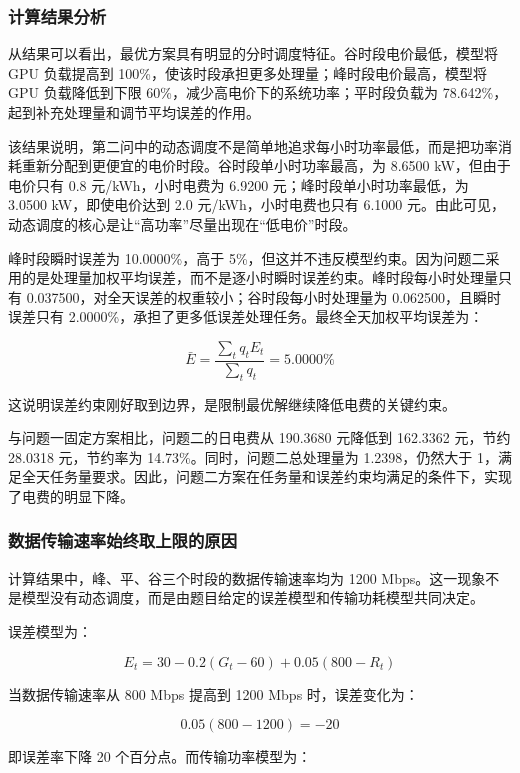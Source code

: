 \documentclass[
]{article}
\begin{document}
\subsubsection{计算结果分析}\label{ux8ba1ux7b97ux7ed3ux679cux5206ux6790}

从结果可以看出，最优方案具有明显的分时调度特征。谷时段电价最低，模型将
GPU 负载提高到 100\%，使该时段承担更多处理量；峰时段电价最高，模型将 GPU
负载降低到下限 60\%，减少高电价下的系统功率；平时段负载为
78.642\%，起到补充处理量和调节平均误差的作用。

该结果说明，第二问中的动态调度不是简单地追求每小时功率最低，而是把功率消耗重新分配到更便宜的电价时段。谷时段单小时功率最高，为
8.6500 kW，但由于电价只有 0.8 元/kWh，小时电费为 6.9200
元；峰时段单小时功率最低，为 3.0500 kW，即使电价达到 2.0
元/kWh，小时电费也只有 6.1000
元。由此可见，动态调度的核心是让``高功率''尽量出现在``低电价''时段。

峰时段瞬时误差为 10.0000\%，高于
5\%，但这并不违反模型约束。因为问题二采用的是处理量加权平均误差，而不是逐小时瞬时误差约束。峰时段每小时处理量只有
0.037500，对全天误差的权重较小；谷时段每小时处理量为
0.062500，且瞬时误差只有
2.0000\%，承担了更多低误差处理任务。最终全天加权平均误差为：

\[\bar{E}=
\frac{\sum_t q_tE_t}{\sum_t q_t}
=5.0000\%\]

这说明误差约束刚好取到边界，是限制最优解继续降低电费的关键约束。

与问题一固定方案相比，问题二的日电费从 190.3680 元降低到 162.3362
元，节约 28.0318 元，节约率为 14.73\%。同时，问题二总处理量为
1.2398，仍然大于
1，满足全天任务量要求。因此，问题二方案在任务量和误差约束均满足的条件下，实现了电费的明显下降。

\subsubsection{数据传输速率始终取上限的原因}\label{ux6570ux636eux4f20ux8f93ux901fux7387ux59cbux7ec8ux53d6ux4e0aux9650ux7684ux539fux56e0}

计算结果中，峰、平、谷三个时段的数据传输速率均为 1200
Mbps。这一现象不是模型没有动态调度，而是由题目给定的误差模型和传输功耗模型共同决定。

误差模型为：

\[E_t = 30 - 0.2(G_t - 60) + 0.05(800 - R_t)\]

当数据传输速率从 800 Mbps 提高到 1200 Mbps 时，误差变化为：

\[0.05(800-1200)=-20\]

即误差率下降 20 个百分点。而传输功率模型为：
\end{document}
